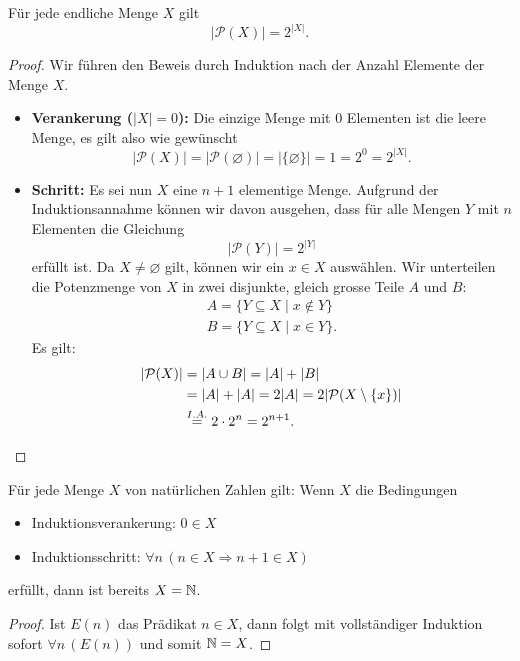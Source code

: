 \begin{bsp}
Für jede endliche Menge $X$ gilt
\[
|\mathcal{P}(X)|=2^{|X|}.
\]
\begin{proof}
Wir führen den Beweis durch Induktion nach der Anzahl Elemente der Menge $X$.
\begin{itemize}
\item \textbf{Verankerung ($|X|=0$):} Die einzige Menge mit $0$ Elementen ist die leere Menge, es gilt also wie gewünscht
\[
|\mathcal{P}(X)|=|\mathcal{P}(\varnothing)|=|\{\varnothing\}|=1=2^0=2^{|X|}.
\]
\item \textbf{Schritt:} Es sei nun $X$ eine $n+1$ elementige Menge. Aufgrund der Induktionsannahme können wir davon ausgehen, dass für alle Mengen $Y$ mit $n$ Elementen die Gleichung
\[
|\mathcal{P}(Y)|=2^{|Y|}
\]
 erfüllt ist. Da $X\neq\varnothing$ gilt, können wir ein $x\in X$ auswählen. Wir unterteilen die Potenzmenge von $X$ in zwei disjunkte, gleich grosse Teile $A$ und $B$:
 \begin{align*}
 A=\{Y\subseteq X\mid x\notin Y \}\\
 B=\{Y\subseteq X\mid x\in Y \}.
 \end{align*}
Es gilt:
\begin{align*}
|\mathcal{P}(X)|&=|A\cup B|=|A|+|B|\\
&=|A|+|A|=2|A|=2|\mathcal{P}(X\setminus\{x\})|\\&\stackrel{I.A.}{=}2\cdot2^n=2^{n+1}.\qedhere
\end{align*}
\end{itemize}
\end{proof}
\end{bsp}

\begin{satz}\label{satz:mengeninduktion}
Für jede Menge $X$ von natürlichen Zahlen gilt: Wenn $X$ die Bedingungen
\begin{itemize}
\item Induktionsverankerung: $0\in X$
\item Induktionsschritt: $\forall n\,(n\in X\Rightarrow n+1\in X)$
\end{itemize}
erfüllt, dann ist bereits $X=\mathbb{N}$.
\end{satz}
\begin{proof}
Ist $E(n)$ das Prädikat $n\in X$, dann folgt mit vollständiger Induktion sofort $\forall n\, (E(n))$ und somit $\mathbb{N}=X$.
\end{proof}

